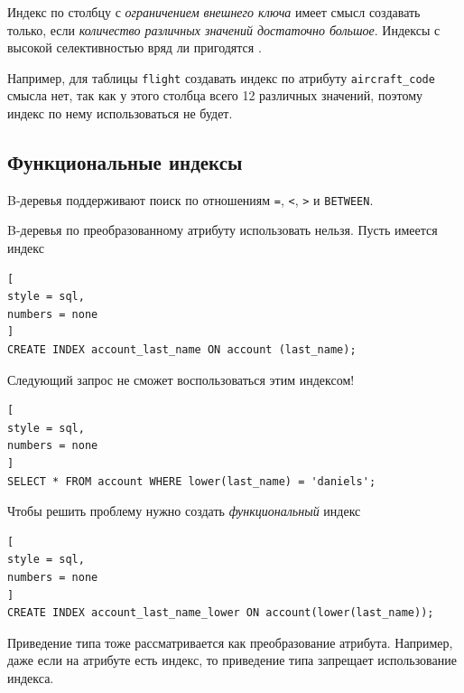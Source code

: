 \documentclass[%
	11pt,
	a4paper,
	utf8,
		]{article}
\begin{document}

Индекс по столбцу с \emph{ограничением внешнего ключа} имеет смысл создавать только, если \emph{количество различных значений достаточно большое}. Индексы с высокой селективностью вряд ли пригодятся \cite[]{dombrovskaya:postgresql-2022}.

Например, для таблицы \verb|flight| создавать индекс по атрибуту \verb|aircraft_code| смысла нет, так как у этого столбца всего 12 различных значений, поэтому индекс по нему использоваться не будет.


\subsection{Функциональные индексы}

B-деревья поддерживают поиск по отношениям \verb|=|, \verb|<|, \verb|>| и \verb|BETWEEN|. 

B-деревья по преобразованному атрибуту использовать нельзя. Пусть имеется индекс
\begin{lstlisting}[
style = sql,
numbers = none
]
CREATE INDEX account_last_name ON account (last_name);
\end{lstlisting}

Следующий запрос не сможет воспользоваться этим индексом!
\begin{lstlisting}[
style = sql,
numbers = none	
]
SELECT * FROM account WHERE lower(last_name) = 'daniels';
\end{lstlisting}

Чтобы решить проблему нужно создать \emph{функциональный} индекс
\begin{lstlisting}[
style = sql,
numbers = none
]
CREATE INDEX account_last_name_lower ON account(lower(last_name));
\end{lstlisting}

Приведение типа тоже рассматривается как преобразование атрибута. Например, даже если на атрибуте есть индекс, то приведение типа запрещает использование индекса.
\end{document}
